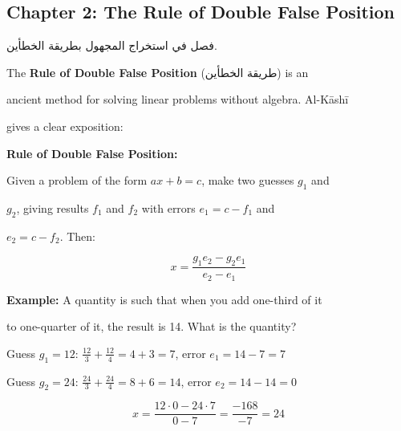 \documentclass[11pt,a4paper]{article}
\newenvironment{arabicbox}{%

  \begin{framed}

  \begin{minipage}{\linewidth-2\fboxsep-2\fboxrule}

  \setlength{\parindent}{0pt}

  \linespread{1.3}\selectfont

}{%

  \end{minipage}

  \end{framed}

}
\newenvironment{mathalgo}{%

  \par\vspace{0.3cm}

  \begin{framed}

  \setlength{\parindent}{0pt}

}{%

  \end{framed}

  \par\vspace{0.3cm}

}
\newcommand{\ar}[1]{{\arabicfont\beginR #1\endR}}
\begin{document}
\subsection{Chapter 2: The Rule of Double False Position}



\begin{arabicbox}

\begin{Arabic}

فصل في استخراج المجهول بطريقة الخطأين.

\end{Arabic}

\end{arabicbox}



\vspace{0.3cm}



The \textbf{Rule of Double False Position} (\ar{طريقة الخطأين}) is an

ancient method for solving linear problems without algebra. Al-K\=ash\=i

gives a clear exposition:



\begin{mathalgo}

\textbf{Rule of Double False Position:}



Given a problem of the form $ax + b = c$, make two guesses $g_1$ and

$g_2$, giving results $f_1$ and $f_2$ with errors $e_1 = c - f_1$ and

$e_2 = c - f_2$. Then:

\[

x = \frac{g_1 e_2 - g_2 e_1}{e_2 - e_1}

\]



\textbf{Example:} A quantity is such that when you add one-third of it

  to one-quarter of it, the result is 14. What is the quantity?



Guess $g_1 = 12$: $\frac{12}{3} + \frac{12}{4} = 4 + 3 = 7$, error $e_1

= 14 - 7 = 7$



Guess $g_2 = 24$: $\frac{24}{3} + \frac{24}{4} = 8 + 6 = 14$, error $e_2

= 14 - 14 = 0$



\[

x = \frac{12 \cdot 0 - 24 \cdot 7}{0 - 7} = \frac{-168}{-7} = 24

\]

\end{mathalgo}
\end{document}

